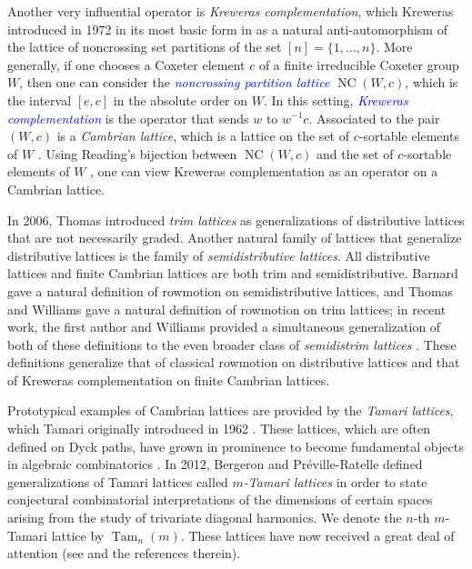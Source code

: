 \documentclass[11pt]{amsart}
\theoremstyle{definition}
\DeclareMathOperator{\NC}{NC}
\DeclareMathOperator{\Tam}{Tam}
\newcommand{\dfn}[1]{\textcolor{blue}{\emph{#1}}}
\begin{document}
Another very influential operator is \emph{Kreweras complementation}, which Kreweras introduced in 1972 in its most basic form in \cite{Kreweras} as a natural anti-automorphism of the lattice of noncrossing set partitions of the set $[n]=\{1,\ldots,n\}$. More generally, if one chooses a Coxeter element $c$ of a finite irreducible Coxeter group $W$, then one can consider the \dfn{noncrossing partition lattice} $\NC(W,c)$, which is the interval $[e,c]$ in the absolute order on $W$. In this setting, \dfn{Kreweras complementation} is the operator that sends $w$ to $w^{-1}c$. Associated to the pair $(W,c)$ is a \emph{Cambrian lattice}, which is a lattice on the set of $c$-sortable elements of $W$ \cite{ReadingCambrian}. Using Reading's bijection between $\NC(W,c)$ and the set of $c$-sortable elements of $W$ \cite{ReadingClusters}, one can view Kreweras complementation as an operator on a Cambrian lattice. 

In 2006, Thomas \cite{Thomas} introduced \emph{trim lattices} as generalizations of distributive lattices that are not necessarily graded. Another natural family of lattices that generalize distributive lattices is the family of \emph{semidistributive lattices}. All distributive lattices and finite Cambrian lattices are both trim and semidistributive. Barnard \cite{Barnard} gave a natural definition of rowmotion on semidistributive lattices, and Thomas and Williams \cite{ThomasWilliams} gave a natural definition of rowmotion on trim lattices; in recent work, the first author and Williams provided a simultaneous generalization of both of these definitions to the even broader class of \emph{semidistrim lattices} \cite{Semidistrim}. These definitions generalize that of classical rowmotion on distributive lattices and that of Kreweras complementation on finite Cambrian lattices.

Prototypical examples of Cambrian lattices are provided by the \emph{Tamari lattices}, which Tamari originally introduced in 1962 \cite{Tamari}. These lattices, which are often defined on Dyck paths, have grown in prominence to become fundamental objects in algebraic combinatorics \cite{Muller}. In 2012, Bergeron and Pr\'eville-Ratelle \cite{Bergeron} defined generalizations of Tamari lattices called \emph{$m$-Tamari lattices} in order to state conjectural combinatorial interpretations of the dimensions of certain spaces arising from the study of trivariate diagonal harmonics. We denote the $n$-th $m$-Tamari lattice by $\Tam_n(m)$. These lattices have now received a great deal of attention (see \cite{BousquetRep, BousquetIntervals, Chatel} and the references therein). 
\end{document}
